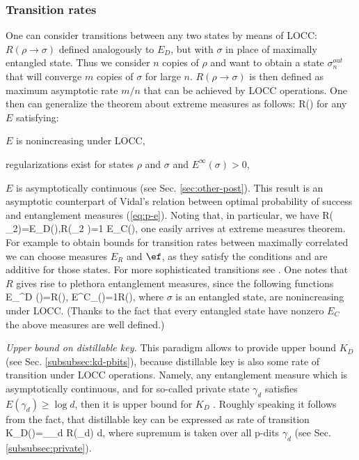 \documentclass[rmp,12pt,preprint]{revtex4-2}
\begin{document}
\subsubsection{Transition rates}
\label{subsec:rates}
One can consider transitions between any two states \cite{BDSW1996} by means of LOCC:
$R(\rho\to \sigma)$ defined analogously to $E_D$,
but with $\sigma$ in place of maximally entangled state. Thus we
consider $n$ copies  of $\rho$ and want to obtain  a state $\sigma_n^{out}$
that will converge $m$ copies  of $\sigma$ for large $n$.
$R(\rho\to \sigma)$ is then defined  as maximum asymptotic rate $m/n$ that can be achieved
by LOCC operations.  One then can generalize the theorem about
extreme measures as follows:
\be
R(\rho\to \sigma) 
\label{eq:rates}
\ee
for any $E$ satisfying:
\bee
\item $E$ is nonincreasing under LOCC,
\item regularizations exist for states $\rho$ and $\sigma$ and $E^\infty(\sigma)>0$,
\item $E$ is asymptotically continuous (see Sec. \ref{sec:other-post}).
\eee This result is an asymptotic counterpart of Vidal's relation
between optimal probability of success and entanglement measures
(\ref{eq:p-e}). Noting that, in particular, we have \be R(\rho\to
\psiplus_2)=E_D(\rho),\quad R(\psiplus_2 \to \rho)={1\over
E_C(\rho)}, \ee one easily arrives at extreme measures theorem. For
example to obtain bounds  for  transition rates between maximally
correlated we can choose measures $E_R$ and $\ef$, as they satisfy
the conditions  and are additive for those states.  For more
sophisticated transitions see \cite{MichalSS2002}. One notes that
$R$ gives rise to plethora entanglement measures, since the
following functions \be E_\sigma^D (\rho)=R(\rho\to \sigma),\quad
E^C_\sigma(\rho)={1\over R(\sigma \to \rho)}, \ee where $\sigma$ is
an entangled state, are nonincreasing under LOCC. (Thanks to the
fact that every entangled state have nonzero $E_C$ the above
measures are well defined.)

{\it Upper bound on distillable key.} This paradigm allows to
provide upper bound $K_D$  (see Sec. \ref{subsubsec:kd-pbits}), because
distillable key is also some rate of transition under LOCC
operations. Namely, any entanglement measure which is asymptotically
continuous, and for so-called private state $\gamma_d$ satisfies
$E(\gamma_d)\geq \log d$, then it is upper bound for $K_D$
\cite{Christandl-PhD}. Roughly speaking it follows from the fact,
that distillable key can be expressed as rate of transition \be
K_D(\rho)=\sup_{\gamma_d} R(\rho\to \gamma_d) \log d, \ee where
supremum is taken over all p-dits  $\gamma_d$ (see Sec. \ref{subsubsec:private}).
\end{document}
